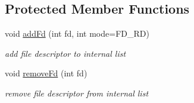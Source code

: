\subsection*{Protected Member Functions}
\begin{DoxyCompactItemize}
\item 
\mbox{\label{classQualityManagerComponent_a3cf3b8eb9b52d2220b50a6539511c07f}} 
void \hyperlink{classQualityManagerComponent_a3cf3b8eb9b52d2220b50a6539511c07f}{add\+Fd} (int fd, int mode=F\+D\+\_\+\+RD)
\begin{DoxyCompactList}\small\item\em add file descriptor to internal list \end{DoxyCompactList}\item 
\mbox{\label{classQualityManagerComponent_a6cd1555a2fa32c4e9cd53975ef3a200f}} 
void \hyperlink{classQualityManagerComponent_a6cd1555a2fa32c4e9cd53975ef3a200f}{remove\+Fd} (int fd)
\begin{DoxyCompactList}\small\item\em remove file descriptor from internal list \end{DoxyCompactList}\end{DoxyCompactItemize}
